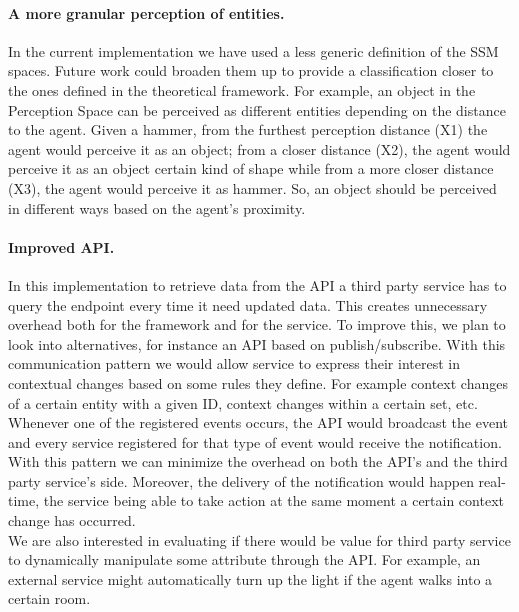 \paragraph{A more granular perception of entities.} In the current implementation we have used a less generic definition of the SSM spaces. Future work could broaden them up to provide a classification closer to the ones defined in the theoretical framework. For example, an object in the Perception Space can be perceived as different entities depending on the distance to the agent. Given a hammer, from the furthest perception distance (X1) the agent would perceive it as an object; from a closer distance (X2), the agent would perceive it as an object certain kind of shape while from a more closer distance (X3), the agent would perceive it as hammer. So, an object should be perceived in different ways based on the agent's proximity.

\paragraph{Improved API.} In this implementation to retrieve data from the API a third party service has to query the endpoint every time it need updated data. This creates unnecessary overhead both for the framework and for the service. To improve this, we plan to look into alternatives, for instance an API based on publish/subscribe. With this communication pattern we would allow service to express their interest in contextual changes based on some rules they define. For example context changes of a certain entity with a given ID, context changes within a certain set, etc. Whenever one of the registered events occurs, the API would broadcast the event and every service registered for that type of event would receive the notification. With this pattern we can minimize the overhead on both the API's and the third party service's side. Moreover, the delivery of the notification would happen real-time, the service being able to take action at the same moment a certain context change has occurred.\\

We are also interested in evaluating if there would be value for third party service to dynamically manipulate some attribute through the API. For example, an external service might automatically turn up the light if the agent walks into a certain room.

